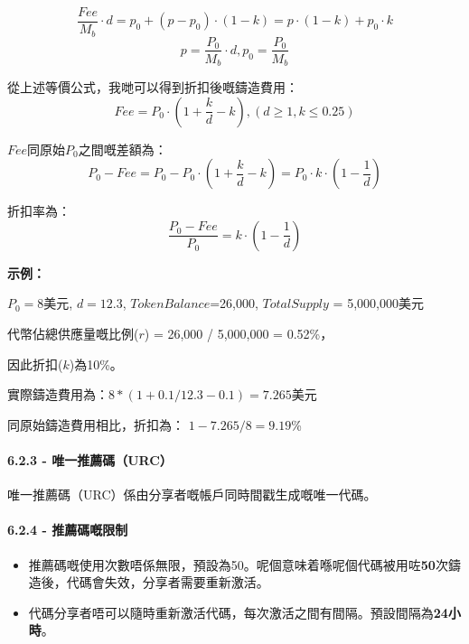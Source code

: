 \documentclass[
]{article}
\begin{document}
\begin{equation}
\frac{Fee}{M_b} \cdot d = p_0 + (p - p_0) \cdot (1 - k) = p \cdot (1 - k) + p_0 \cdot k
\end{equation} \begin{equation}
p = \frac{P_0}{M_b} \cdot d, p_0 = \frac{P_0}{M_b}
\end{equation}

從上述等價公式，我哋可以得到折扣後嘅鑄造費用： \begin{equation}
Fee = P_0 \cdot (1 + \frac{k}{d} - k),  (d \geq 1, k \leq 0.25)
\end{equation}

\(Fee\)同原始\(P_0\)之間嘅差額為： \begin{equation}
P_0 - Fee = P_0 - P_0 \cdot (1 + \frac{k}{d} - k) = P_0 \cdot k \cdot (1 - \frac{1}{d})
\end{equation}

折扣率為： \begin{equation}
\frac{P_0-Fee}{P_0} =k \cdot (1 - \frac{1}{d})
\end{equation}

\textbf{示例：}

\(P_0=8\)美元, \(d=12.3\), \(Token Balance\)=26,000, \(Total Supply\) =
5,000,000美元

代幣佔總供應量嘅比例(\(r\)) = 26,000 / 5,000,000 = 0.52\%，

因此折扣(\(k\))為10\%。

實際鑄造費用為：\(8 * (1 + 0.1 / 12.3 - 0.1) = 7.265\)美元

同原始鑄造費用相比，折扣為： \(1 - 7.265 / 8 = 9.19\)\%

\paragraph{6.2.3 -
唯一推薦碼（URC）}\label{ux552fux4e00ux63a8ux85a6ux78bcurc}

唯一推薦碼（URC）係由分享者嘅帳戶同時間戳生成嘅唯一代碼。

\paragraph{6.2.4 -
推薦碼嘅限制}\label{ux63a8ux85a6ux78bcux5605ux9650ux5236}

\begin{itemize}
\item
  推薦碼嘅使用次數唔係無限，預設為50。呢個意味着喺呢個代碼被用咗\textbf{50}次鑄造後，代碼會失效，分享者需要重新激活。
\item
  代碼分享者唔可以隨時重新激活代碼，每次激活之間有間隔。預設間隔為\textbf{24小時}。
\end{itemize}
\end{document}
